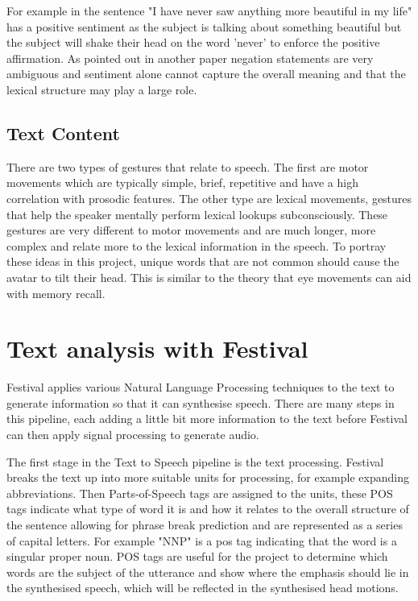 \documentclass[bsc,frontabs,twoside,singlespacing,parskip]{infthesis}
\begin{document}
For example in the sentence "I have never saw anything more beautiful in my life" has a positive sentiment as the subject is talking about something beautiful but the subject will shake their head on the word 'never' to enforce the positive affirmation. As pointed out in another paper \cite{negative_sentiment} negation statements are very ambiguous and sentiment alone cannot capture the overall meaning and that the lexical structure may play a large role.

\subsection{Text Content}

There are two types of gestures that relate to speech. \cite{lexical_gestures} The first are motor movements which are typically simple, brief, repetitive and have a high correlation with prosodic features. The other type are lexical movements, gestures that help the speaker mentally perform lexical lookups subconsciously. These gestures are very different to motor movements and are much longer, more complex and relate more to the lexical information in the speech. To portray these ideas in this project, unique words that are not common should cause the avatar to tilt their head. This is similar to the theory that eye movements can aid with memory recall. \cite{eye_movements}

\section{Text analysis with Festival}

Festival applies various Natural Language Processing techniques to the text to generate information  so that it can synthesise speech.  There are many steps in this pipeline, each adding a little bit more information to the text before Festival can then apply signal processing to generate audio. 

The first stage in the Text to Speech pipeline is the text processing. Festival breaks the text up into more suitable units for processing, for example expanding abbreviations. Then Parts-of-Speech tags are assigned to the units, these POS tags indicate what type of word it is and how it relates to the overall structure of the sentence allowing for phrase break prediction and are represented as a series of capital letters. For example "NNP" is a pos tag indicating that the word is a singular proper noun. POS tags are useful for the project to determine which words are the subject of the utterance and show where the emphasis should lie in the synthesised speech, which will be reflected in the synthesised head motions.
\end{document}
